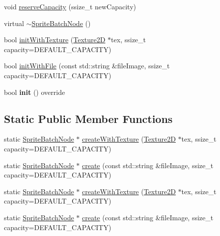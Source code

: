 \begin{DoxyCompactItemize}
\item 
void \hyperlink{classSpriteBatchNode_a98e5558e331befb2454d11a9395ae6ae}{reserve\+Capacity} (ssize\+\_\+t new\+Capacity)
\item 
virtual \hyperlink{classSpriteBatchNode_a9d8d2cd94ab1a9c24e5df54b22f05350}{$\sim$\+Sprite\+Batch\+Node} ()
\item 
bool \hyperlink{classSpriteBatchNode_aeec99ca2f5e03b80fb8d1f81bbc5034a}{init\+With\+Texture} (\hyperlink{classTexture2D}{Texture2D} $\ast$tex, ssize\+\_\+t capacity=D\+E\+F\+A\+U\+L\+T\+\_\+\+C\+A\+P\+A\+C\+I\+TY)
\item 
bool \hyperlink{classSpriteBatchNode_af6150c9adf70652842ca6e7b01c8cc08}{init\+With\+File} (const std\+::string \&file\+Image, ssize\+\_\+t capacity=D\+E\+F\+A\+U\+L\+T\+\_\+\+C\+A\+P\+A\+C\+I\+TY)
\item 
\mbox{\label{classSpriteBatchNode_a6016e84d966db338de57b2bbe00567ca}} 
bool {\bfseries init} () override
\end{DoxyCompactItemize}
\subsection*{Static Public Member Functions}
\begin{DoxyCompactItemize}
\item 
static \hyperlink{classSpriteBatchNode}{Sprite\+Batch\+Node} $\ast$ \hyperlink{classSpriteBatchNode_a981611b78bc9c5e985ce2b03ecb85b9a}{create\+With\+Texture} (\hyperlink{classTexture2D}{Texture2D} $\ast$tex, ssize\+\_\+t capacity=D\+E\+F\+A\+U\+L\+T\+\_\+\+C\+A\+P\+A\+C\+I\+TY)
\item 
static \hyperlink{classSpriteBatchNode}{Sprite\+Batch\+Node} $\ast$ \hyperlink{classSpriteBatchNode_a470e1bd31aee44de0c6b09592442c77b}{create} (const std\+::string \&file\+Image, ssize\+\_\+t capacity=D\+E\+F\+A\+U\+L\+T\+\_\+\+C\+A\+P\+A\+C\+I\+TY)
\item 
static \hyperlink{classSpriteBatchNode}{Sprite\+Batch\+Node} $\ast$ \hyperlink{classSpriteBatchNode_a5c722a9108db557fa9c8a0300b148984}{create\+With\+Texture} (\hyperlink{classTexture2D}{Texture2D} $\ast$tex, ssize\+\_\+t capacity=D\+E\+F\+A\+U\+L\+T\+\_\+\+C\+A\+P\+A\+C\+I\+TY)
\item 
static \hyperlink{classSpriteBatchNode}{Sprite\+Batch\+Node} $\ast$ \hyperlink{classSpriteBatchNode_a5b81861dc8fe46a8c17b524ad0383029}{create} (const std\+::string \&file\+Image, ssize\+\_\+t capacity=D\+E\+F\+A\+U\+L\+T\+\_\+\+C\+A\+P\+A\+C\+I\+TY)
\end{DoxyCompactItemize}
